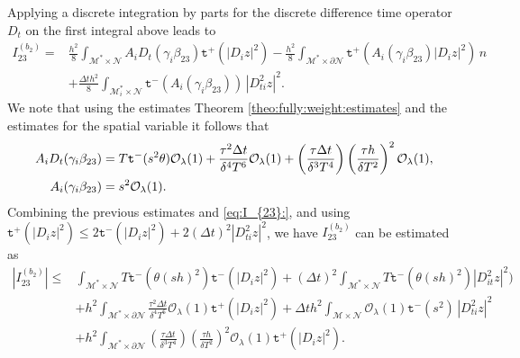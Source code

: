 \documentclass[11pt,oneside,leqno]{amsart}
\numberwithin{equation}{section}
\numberwithin{equation}{section}
\newcommand{\trp}{\mathtt t^+}
\newcommand{\trm}{\mathtt t^-}
\begin{document}
Applying a discrete integration by parts for the discrete difference time operator $D_{t}$ on the first integral above leads to
\begin{equation}
\begin{split}
    I_{23}^{(b_{2})}=&\frac{h^{2}}{8}\int_{\mathcal{M}^{\ast}\times\mathcal{N}}A_{i}D_{t}(\gamma_{i}\beta_{23})\trp(|D_{i}z|^{2})-\frac{h^{2}}{8}\int_{\mathcal{M}^{\ast}\times\partial\mathcal{N}}\trp(A_{i}(\gamma_{i}\beta_{23})|D_{i}z|^{2})\,n\\
    &+\frac{\Delta th^{2}}{8}\int_{\mathcal{M}_{i}^{\ast}\times\mathcal{N}}\trm(A_{i}(\gamma_{i}\beta_{23}))\,|D^{2}_{ti}z|^{2}.
    \end{split}
\end{equation}
We note that using the estimates Theorem \ref{theo:fully:weight:estimates} and the estimates for the spatial variable it follows that
\begin{equation}\label{eq:I_{23}:}
    \begin{split}
        A_{i}D_{t}(\gamma_{i}\beta_{23})&=T\trm(s^{2}\theta)\mathcal{O}_{\lambda}(1)+\frac{\tau^{2}\Delta t}{\delta^{4} T^{6}}\mathcal{O}_{\lambda}(1)+\left( \frac{\tau \Delta t}{\delta^{3}T^{4}}\right)\left( \frac{\tau h}{\delta T^{2}}\right)^{2}\mathcal{O}_{\lambda}(1),\\
        A_{i}(\gamma_{i}\beta_{23})&=s^{2}\mathcal{O}_{\lambda}(1).
    \end{split}
\end{equation}
Combining the previous estimates and \eqref{eq:I_{23}:}, and using $\trp(|D_{i}z|^{2})\leq 2\trm(|D_{i}z|^{2})+2(\Delta t)^{2}|D_{ti}^{2}z|^{2}$, we have $I_{23}^{(b_{2})}$ can be estimated as 
\begin{equation}\label{ine:I:23:b2}
\begin{aligned}
|I_{23}^{(b_{2})}|\leq&\int_{\mathcal{M}^{\ast}\times\mathcal{N}}T\trm(\theta (sh)^{2})\trm(|D_{i}z|^{2})+(\Delta t)^{2}\int_{\mathcal{M}^{\ast}\times\mathcal{N}}T\trm(\theta (sh)^{2})|D^{2}_{it}z|^{2})\\
&+h^{2}\int_{\mathcal{M}^{\ast}\times\partial\mathcal{N}}\frac{\tau^{2}\Delta t}{\delta^{4} T^{6}}\mathcal{O}_{\lambda}(1)\trp(|D_{i}z|^{2})+\Delta th^{2}\int_{\mathcal{M}\times\mathcal{N}}\mathcal{O}_{\lambda}(1)\trm(s^{2})\,|D^{2}_{ti}z|^{2}\\
&+h^{2}\int_{\mathcal{M}^{\ast}\times \partial \mathcal{N}}\left( \frac{\tau \Delta t}{\delta^{3}T^{4}}\right)\left( \frac{\tau h}{\delta T^{2}}\right)^{2}\mathcal{O}_{\lambda}(1)\trp(|D_{i}z|^{2}).
    \end{aligned}
\end{equation}
\end{document}
